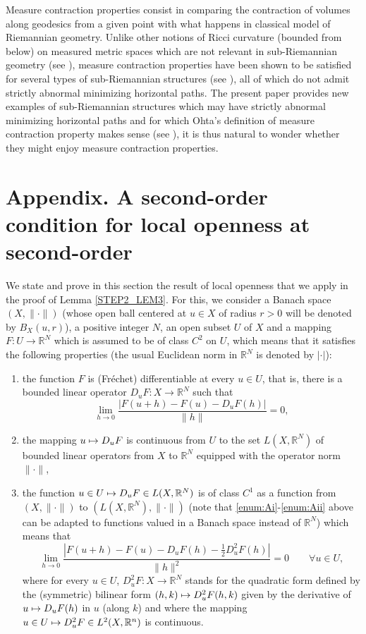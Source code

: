 \documentclass[JEP,XML,SOM,Unicode,NoFloatCountersInSection,published]{cedram}
\newenvironment{enumeratei}
{\bgroup\def\theenumi{\roman{enumi}}\def\theenumii{\arabic{enumii}}\begin{enumerate}}
{\end{enumerate}\egroup}
\newcommand\mto{\mathchoice{\longmapsto}{\mapsto}{\mapsto}{\mapsto}}
\newcommand\R{\mathbb R}
\theoremstyle{definition}
\begin{document}
Measure contraction properties consist in comparing the contraction of volumes along geodesics from a given point with what happens in classical model of Riemannian geometry. Unlike other notions of Ricci curvature (bounded from below) on measured metric spaces which are not relevant in sub-Riemannian geometry (see \cite{juillet21}), measure contraction properties have been shown to be satisfied for several types of sub-Riemannian structures (see \cite{juillet09,rifford13,al14,lee16,lcz16,rizzi16,bar18,br20}), all of which do not admit strictly abnormal minimizing horizontal paths. The present paper provides new examples of sub-Riemannian structures which may have strictly abnormal minimizing horizontal paths and for which Ohta's definition of measure contraction property makes sense (see \cite{ohta07,rifford13}), it is thus natural to wonder whether they might enjoy measure contraction properties.

\appendix
\setcounter{section}{1}
\setcounter{equation}{0}

\section*{Appendix. A second-order condition for local openness at second-order}\label{SECSecondOrder}

We state and prove in this section the result of local openness that we apply in the proof of Lemma \ref{STEP2_LEM3}. For this, we consider a Banach space $(X,\|\cdot\|)$ (whose open ball centered at $u\in X$ of radius $r>0$ will be denoted by $B_X(u,r)$), a positive integer $N$, an open subset $U$ of $X$ and a mapping $F: U \to \R^N$ which is assumed to be of class $C^2$ on $U$, which means that it satisfies the following properties (the usual Euclidean norm in $\R^N$ is denoted by $|\cdot|$):
\begin{enumeratei}
\item\label{enum:Ai}
the function $F$ is (Fréchet) differentiable at every $u\in U$, that is, there is a bounded linear operator $D_uF:X \to \R^N$ such that
\[
\lim_{h \to 0} \frac{\left| F(u+h) - F(u) - D_uF (h) \right| }{ \| h \|} =0,
\]
\item\label{enum:Aii}
the mapping $u \mto D_uF$ is continuous from $U$ to the set $L(X,\R^N)$ of bounded linear operators from $X$ to $\R^N$ equipped with the operator norm $\|\cdot\|$,
\item\label{enum:Aiii}
the function $u\in U \mto D_uF \in L(X,\R^N)$ is of class $C^1$ as a function from $(X,\|\cdot \|)$ to $(L(X,\R^N),\|\cdot\|)$ (note that \eqref{enum:Ai}-\eqref{enum:Aii} above can be adapted to functions valued in a Banach space instead of $\R^N$) which means that
\[
\lim_{h \to 0} \frac{\left| F(u+h) - F(u) - D_uF (h) - \frac{1}{2} D_u^2 F (h) \right| }{ \| h \|^2} =0 \qquad \forall u \in U,
\]
where for every $u\in U$, $D_u^2F:X \to \R^N$ stands for the quadratic form defined by the (symmetric) bilinear form $(h,k) \mto D_u^2F(h,k)$ given by the derivative of $u\mto D_uF(h)$ in $u$ (along $k$) and where the mapping $u\in U\mto D_u^2F\in L^2(X,\R^n)$ is continuous.
\end{enumeratei}
\end{document}
